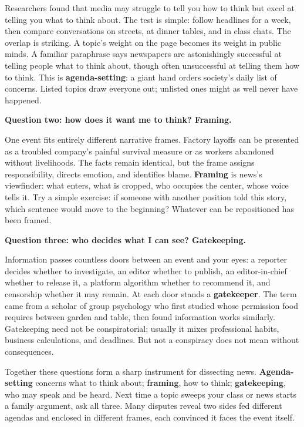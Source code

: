 Researchers found that media may struggle to tell you how to think but excel at telling you what to think about. The test is simple: follow headlines for a week, then compare conversations on streets, at dinner tables, and in class chats. The overlap is striking. A topic's weight on the page becomes its weight in public minds. A familiar paraphrase says newspapers are astonishingly successful at telling people what to think about, though often unsuccessful at telling them how to think. This is \textbf{agenda-setting}: a giant hand orders society's daily list of concerns. Listed topics draw everyone out; unlisted ones might as well never have happened.

\textbf{Question two: how does it want me to think? Framing.}

One event fits entirely different narrative frames. Factory layoffs can be presented as a troubled company's painful survival measure or as workers abandoned without livelihoods. The facts remain identical, but the frame assigns responsibility, directs emotion, and identifies blame. \textbf{Framing} is news's viewfinder: what enters, what is cropped, who occupies the center, whose voice tells it. Try a simple exercise: if someone with another position told this story, which sentence would move to the beginning? Whatever can be repositioned has been framed.

\textbf{Question three: who decides what I can see? Gatekeeping.}

Information passes countless doors between an event and your eyes: a reporter decides whether to investigate, an editor whether to publish, an editor-in-chief whether to release it, a platform algorithm whether to recommend it, and censorship whether it may remain. At each door stands a \textbf{gatekeeper}. The term came from a scholar of group psychology who first studied whose permission food requires between garden and table, then found information works similarly. Gatekeeping need not be conspiratorial; usually it mixes professional habits, business calculations, and deadlines. But not a conspiracy does not mean without consequences.

Together these questions form a sharp instrument for dissecting news. \textbf{Agenda-setting} concerns what to think about; \textbf{framing}, how to think; \textbf{gatekeeping}, who may speak and be heard. Next time a topic sweeps your class or news starts a family argument, ask all three. Many disputes reveal two sides fed different agendas and enclosed in different frames, each convinced it faces the event itself.

